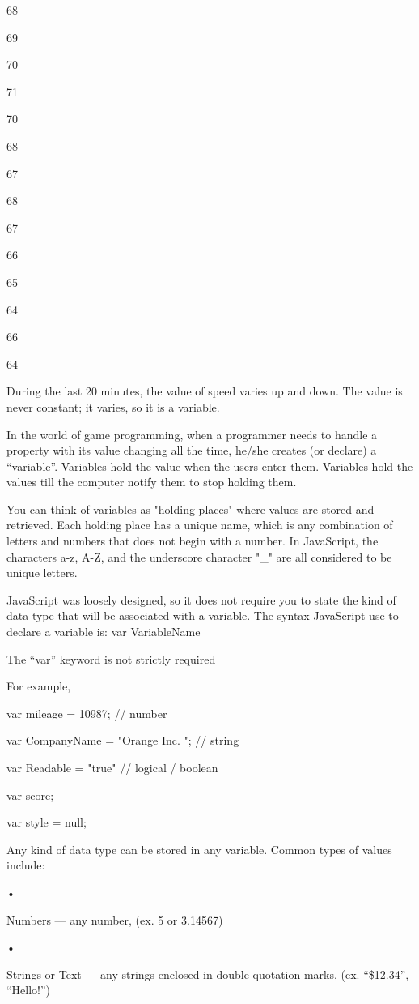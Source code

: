 \documentclass[
]{article}
\begin{document}
68

69

70

71

70

68

67

68

67

66

65

64

66

64

During the last 20 minutes, the value of speed varies up and down. The
value is never constant; it varies, so it is a variable.

In the world of game programming, when a programmer needs to handle a
property with its value changing all the time, he/she creates (or
declare) a ``variable''. Variables hold the value when the users enter
them. Variables hold the values till the computer notify them to stop
holding them.

You can think of variables as "holding places" where values are stored
and retrieved. Each holding place has a unique name, which is any
combination of letters and numbers that does not begin with a number. In
JavaScript, the characters a-z, A-Z, and the underscore character "\_"
are all considered to be unique letters.

JavaScript was loosely designed, so it does not require you to state the
kind of data type that will be associated with a variable. The syntax
JavaScript use to declare a variable is: var VariableName

The ``var'' keyword is not strictly required

For example,

var mileage = 10987; // number

var CompanyName = "Orange Inc. "; // string

var Readable = "true" // logical / boolean

var score;

var style = null;

Any kind of data type can be stored in any variable. Common types of
values include:

•

Numbers --- any number, (ex. 5 or 3.14567)

•

Strings or Text --- any strings enclosed in double quotation marks, (ex.
``\$12.34'', ``Hello!'')
\end{document}
